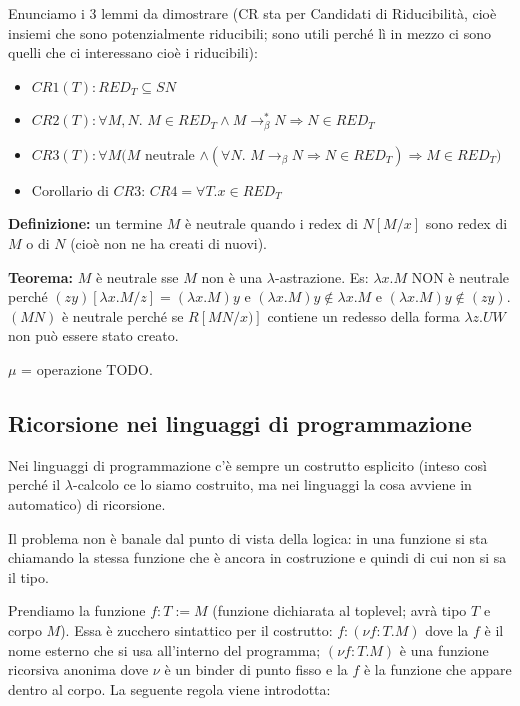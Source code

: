 \documentclass{article}
\begin{document}
\bigskip

Enunciamo i 3 lemmi da dimostrare (CR sta per Candidati di Riducibilità, cioè insiemi che sono potenzialmente riducibili; sono utili perché lì in mezzo ci sono quelli che ci interessano cioè i riducibili):
\begin{itemize}
    \item $CR1(T): RED_T \subseteq SN$
    \item $CR2(T): \forall M,N.\,\,M\in RED_T\land M\to_\beta^*N\Rightarrow N\in RED_T$
    \item $CR3(T):\forall M(M$ {\color{red}neutrale} $\land(\forall N.\,\, M\to_\beta N \Rightarrow N\in RED_T) \Rightarrow M\in RED_T)$
    \item Corollario di $CR3$: $CR4 =\forall T.x\in RED_T$
\end{itemize}

\bigskip

\textbf{Definizione:} un termine $M$ è {\color{red}neutrale} quando i redex di $N[M/x]$ sono redex di $M$ o di $N$ (cioè non ne ha creati di nuovi).

\bigskip

\textbf{Teorema:} $M$ è neutrale sse $M$ non è una $\lambda$-astrazione. Es: $\lambda x.M$ NON è neutrale perché $(zy)[\lambda x.M/z] = (\lambda x.M)y$ e $(\lambda x.M)y \not\in\lambda x.M$ e  $(\lambda x.M)y \not\in(zy)$. $(MN)$ è neutrale perché se $R[MN/x)]$ contiene un redesso della forma $\lambda z.UW$ non può essere stato creato.

$\mu$ = operazione TODO.

\subsection{Ricorsione nei linguaggi di programmazione}
Nei linguaggi di programmazione c'è sempre un costrutto esplicito (inteso così perché il $\lambda$-calcolo ce lo siamo costruito, ma nei linguaggi la cosa avviene in automatico) di ricorsione.

\bigskip

Il problema non è banale dal punto di vista della logica: in una funzione si sta chiamando la stessa funzione che è ancora in costruzione e quindi di cui non si sa il tipo.

\bigskip

Prendiamo la funzione $f : T := M$ (funzione dichiarata al toplevel; avrà tipo $T$ e corpo $M$). Essa è zucchero sintattico per il costrutto: $f:(\nu f:T.M)$ dove la $f$ è il nome esterno che si usa all'interno del programma; $(\nu f:T.M)$ è una funzione ricorsiva anonima dove $\nu$ è un binder di punto fisso e la $f$ è la funzione che appare dentro al corpo. La seguente regola viene introdotta:
\end{document}
